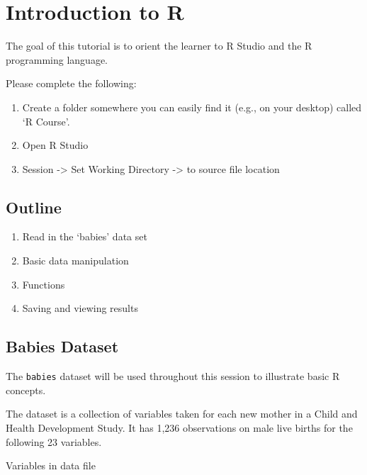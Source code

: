\documentclass[
]{book}
\providecommand{\tightlist}{%
  \setlength{\itemsep}{0pt}\setlength{\parskip}{0pt}}
\begin{document}
\hypertarget{introduction-to-r}{%
\chapter*{Introduction to R}\label{introduction-to-r}}

The goal of this tutorial is to orient the learner to R Studio and the R programming language.

Please complete the following:

\begin{enumerate}
\def\labelenumi{\arabic{enumi}.}
\tightlist
\item
  Create a folder somewhere you can easily find it (e.g., on your desktop) called `R Course'.
\item
  Open R Studio
\item
  Session -\textgreater{} Set Working Directory -\textgreater{} to source file location
\end{enumerate}

\hypertarget{outline}{%
\section*{Outline}\label{outline}}

\begin{enumerate}
\def\labelenumi{\arabic{enumi}.}
\tightlist
\item
  Read in the `babies' data set
\item
  Basic data manipulation
\item
  Functions
\item
  Saving and viewing results
\end{enumerate}

\hypertarget{babies-dataset}{%
\section*{Babies Dataset}\label{babies-dataset}}

The \texttt{babies} dataset will be used throughout this session to illustrate basic R concepts.

The dataset is a collection of variables taken for each new mother in a Child and Health Development Study. It has 1,236 observations on male live births for the following 23 variables.

Variables in data file
\end{document}
